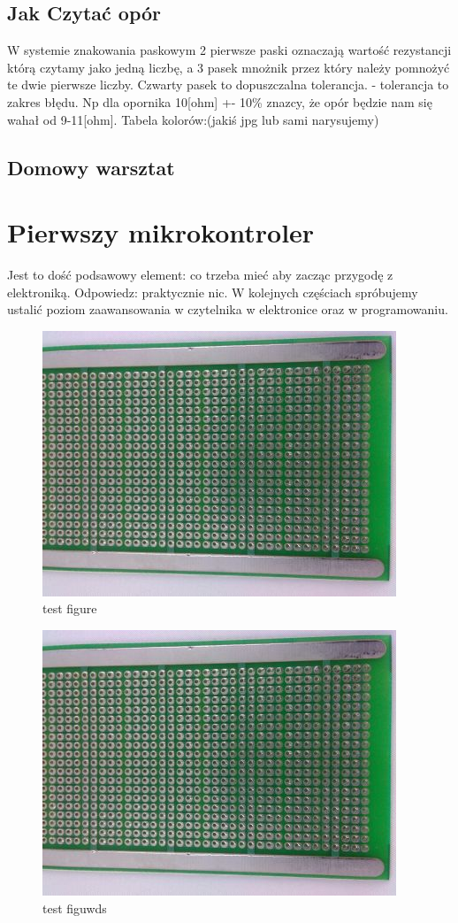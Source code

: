 	\subsection{Jak Czytać opór}
	W systemie znakowania paskowym 2 pierwsze paski oznaczają wartość rezystancji którą czytamy jako jedną liczbę, a 3 pasek mnożnik przez który należy pomnożyć te dwie pierwsze liczby.
Czwarty pasek to dopuszczalna tolerancja. - tolerancja to zakres błędu. Np dla opornika 10[ohm] +- 10\% znazcy, że opór będzie nam się wahał od 9-11[ohm].
Tabela kolorów:(jakiś jpg lub sami narysujemy)

	\subsection {Domowy warsztat}
    
%        
        

\section{Pierwszy mikrokontroler}
		Jest to dość podsawowy element: co trzeba mieć aby zacząc przygodę z elektroniką. Odpowiedz: praktycznie nic. W kolejnych częściach spróbujemy ustalić poziom zaawansowania w czytelnika w elektronice oraz w programowaniu.
\begin{figure}[h]
  \centering
  \includegraphics[scale=0.1,right]{universe.jpg}
  \caption{test figure}
  \label{fig:test}
\end{figure}
\begin{figure}[h]
  \centering
  \includegraphics[scale=0.1,left]{universe.jpg}
  \caption{test figuwds}
  \label{fig:test}
\end{figure}

